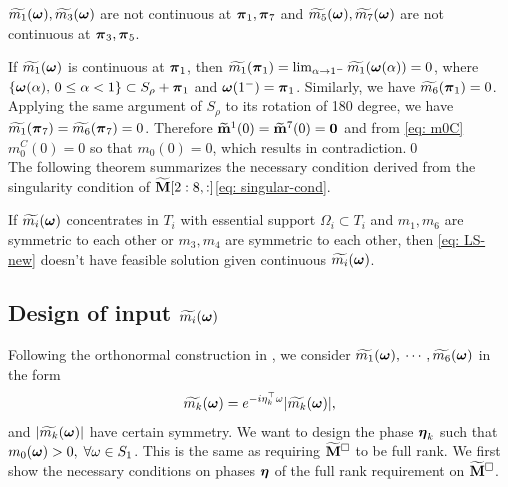 \begin{proposition}
$\widetilde{m_{1}}(\boldsymbol{\omega}),\widetilde{m_{3}}(\boldsymbol{\omega})$ are not continuous at $\boldsymbol{\pi}_1,\boldsymbol{\pi}_7$ and $\widetilde{m_{5}}(\boldsymbol{\omega}),\widetilde{m_{7}}(\boldsymbol{\omega})$ are not continuous at $\boldsymbol{\pi}_3,\boldsymbol{\pi}_5$.
\end{proposition}
If $\widetilde{m_{1}}(\boldsymbol{\omega})$ is continuous at $\boldsymbol{\pi}_1$, then $\widetilde{m_1}(\boldsymbol{\pi}_1) = \lim_{\alpha\rightarrow 1^-}\widetilde{m_1}(\boldsymbol{\omega}(\alpha)) = 0$, where $\{\boldsymbol{\omega}(\alpha),\,0\leq \alpha<1\} \subset S_\rho + \boldsymbol{\pi}_1$ and $\boldsymbol{\omega}(1^-) = \boldsymbol{\pi}_1$. Similarly, we have $\widetilde{m_6}(\boldsymbol{\pi}_1) = 0$. Applying the same argument of $S_\rho$ to its rotation of 180 degree, we have $\widetilde{m_1}(\boldsymbol{\pi}_7) = \widetilde{m_6}(\boldsymbol{\pi}_7) = 0$. Therefore $\widetilde{\mathbf{m}}^{1}(0) = \widetilde{\mathbf{m}}^{7}(0) = \mathbf{0}$ and from \eqref{eq: m0C} $m_0^C(0)=0$ so that $m_0(0)=0$, %
 which results in contradiction.\qed\\[1em]
The following theorem summarizes the necessary condition derived from the singularity condition of $\widetilde{\mathbf{M}}[2:8,:] $\eqref{eq: singular-cond}. 
\begin{theorem}\label{thm: thm}
If  $\widetilde{m_{i}}(\boldsymbol{\omega})$ concentrates in $T_i$ with essential support $\Omega_i\subset T_i$ and $m_1,m_6$ are symmetric to each other or $m_3,m_4$ are symmetric to each other,  then  \eqref{eq: LS-new} doesn't have feasible solution given continuous $\widetilde{m_{i}}(\boldsymbol{\omega})$.
\end{theorem}

\subsection{Design of input $\widetilde{m_{i}}(\boldsymbol{\omega})$}\label{sec: phase-design}
Following the orthonormal construction in \cite{yin2014orthshear}, we consider $\widetilde{m_{1}}(\boldsymbol{\omega}),$ $\cdots,\widetilde{m_{6}}(\boldsymbol{\omega})$ in the form 
\begin{align}\label{eq: m-form}
\widetilde{m_{k}}(\boldsymbol{\omega}) = e^{-i\eta_k^\top\omega}|\widetilde{m_{k}}(\boldsymbol{\omega})|,
\end{align}
 and $|\widetilde{m_{k}}(\boldsymbol{\omega})|$ have certain symmetry. We want to design the phase $\boldsymbol{\eta}_k$ such that $m_0(\boldsymbol{\omega}) > 0, \; \forall \omega\in S_1$. This is the same as requiring $\widetilde{\mathbf{M}}^{\Box}$ to be full rank.
 We first show the necessary conditions on phases $\boldsymbol{\eta}$ of the full rank requirement on $\widetilde{\mathbf{M}}^{\Box}$.
 
